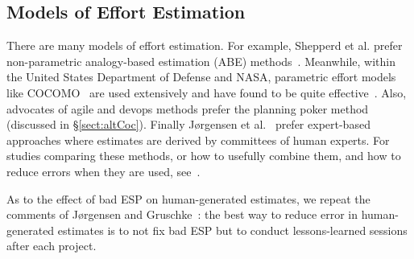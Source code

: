 \documentclass[final,twocolumn]{elsarticle}
\newcommand{\etal}{et al.}
\newcommand{\tion}[1]{\S\ref{sect:#1}}
\theoremstyle{break}
\begin{document}

  \subsection{Models of Effort Estimation}\label{sect:emodels}
  There are many models of effort estimation.
   For example, Shepperd et
 al. prefer non-parametric analogy-based estimation (ABE)
 methods~\cite{shepperd1997estimating}.  Meanwhile, within the
 United States Department of Defense and NASA,
 parametric effort models like
 COCOMO~\cite{boehm81} are used extensively and
 have found to be quite effective~\cite{lum02}.
 Also, advocates of agile and devops methods prefer
 the planning poker method (discussed in \tion{altCoc}).
 Finally J{\o}rgensen  et al.~\cite{jorgensen09} prefer
 expert-based approaches where estimates are derived
 by committees of human experts.  For studies
 comparing these methods, or how to usefully combine
 them, and how to reduce errors when they are used,
 see~\cite{koc11b,Minku2013,garg15,me13a}.

 

 
As to the effect of bad ESP on human-generated estimates, we repeat the comments of
J{\o}rgensen and Gruschke~\cite{jorgensen09}: the best way to reduce error
in human-generated estimates is to not fix bad ESP but to
conduct lessons-learned sessions after each project. 
 
\end{document}
